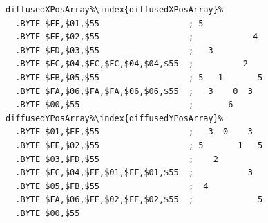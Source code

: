 \begin{minipage}[b]{0.48\linewidth}
\begin{lrbox}{\mybox}%
\begin{lstlisting}[basicstyle=\ttfamily\tiny,escapechar=\%]
diffusedXPosArray%\index{diffusedXPosArray}%
  .BYTE $FF,$01,$55                  ; 5            
  .BYTE $FE,$02,$55                  ;            4 
  .BYTE $FD,$03,$55                  ;   3          
  .BYTE $FC,$04,$FC,$FC,$04,$04,$55  ;          2   
  .BYTE $FB,$05,$55                  ; 5   1       5
  .BYTE $FA,$06,$FA,$FA,$06,$06,$55  ;   3    0  3  
  .BYTE $00,$55                      ;       6      
diffusedYPosArray%\index{diffusedYPosArray}%
  .BYTE $01,$FF,$55                  ;   3  0    3  
  .BYTE $FE,$02,$55                  ; 5       1   5
  .BYTE $03,$FD,$55                  ;    2         
  .BYTE $FC,$04,$FF,$01,$FF,$01,$55  ;           3  
  .BYTE $05,$FB,$55                  ;  4           
  .BYTE $FA,$06,$FE,$02,$FE,$02,$55  ;             5
  .BYTE $00,$55
\end{lstlisting}
\end{lrbox}%
\scalebox{0.8}{\usebox{\mybox}}

\end{minipage}
